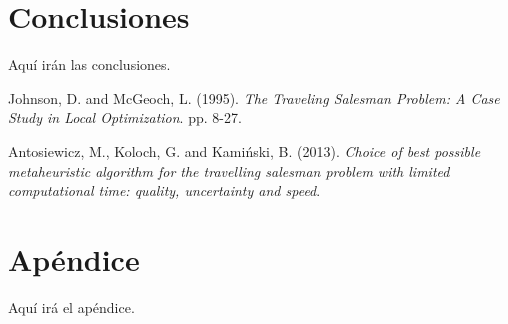 \documentclass{ci5652}
\begin{document}
\section*{Conclusiones}

Aquí irán las conclusiones.


\small


\begin{thebibliography}{99}

  \newblock Johnson, D. and  McGeoch, L. (1995). \textit{The Traveling Salesman Problem: A Case Study in Local Optimization}. pp. 8-27.

  \newblock Antosiewicz, M., Koloch, G. and Kamiński, B. (2013). \textit{Choice of best possible metaheuristic algorithm for the travelling salesman problem with limited computational time: quality, uncertainty and speed}.

\end{thebibliography}

\newpage
\section*{Apéndice}
Aquí irá el apéndice.
\end{document}
